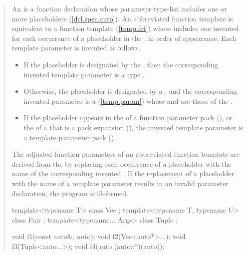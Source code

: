 \begin{quote}
\pnum
An  is a function declaration whose
parameter-type-list includes one or more placeholders (\ref{dcl.spec.auto}).
% 
An abbreviated function template is equivalent to a function template
(\ref{temp.fct}) whose 
includes one invented  for each occurrence 
of a placeholder in the ,
in order of appearance. 
% 
Each template parameter is invented as follows.
\begin{itemize}
\item If the placeholder is designated by the 
, then the corresponding invented template 
parameter is a type .

\item Otherwise, the placeholder is designated by a 
, and the corresponding invented 
parameter is a  (\ref{temp.param}) whose 
 and  
are those of the .

\item If the placeholder appears in the  of a 
function parameter pack (), or the 
 of a  that is a pack 
expansion (), the invented template parameter is a 
template parameter pack ().
\end{itemize}
% 
The adjusted function parameters of an abbreviated function template are derived
from the  by replacing each 
occurrence of a placeholder with the name of the corresponding invented 
.
% 
If the replacement of a placeholder with the name of a template parameter
results in an invalid parameter declaration, the program is ill-formed.
% 
% 
\enterexample
\begin{codeblock}
template<typename T> class Vec { };
template<typename T, typename U> class Pair { };
template<typename... Args> class Tuple { };

void f1(const auto&, auto);
void f2(Vec<auto*>...);
void f3(Tuple<auto...>);
void f4(auto (auto::*)(auto));


\end{codeblock}
\end{quote}

